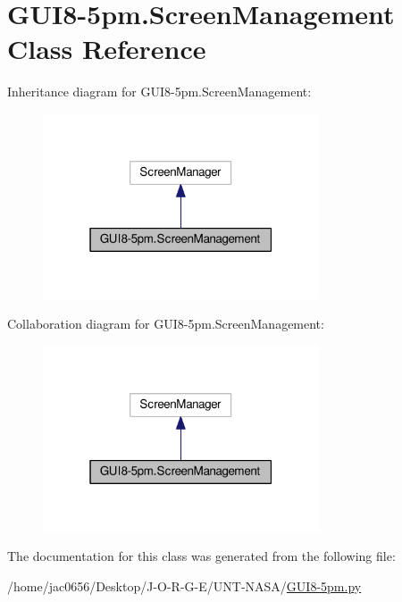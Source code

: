 \hypertarget{classGUI8-5pm_1_1ScreenManagement}{}\section{G\+U\+I8-\/5pm.Screen\+Management Class Reference}
\label{classGUI8-5pm_1_1ScreenManagement}


Inheritance diagram for G\+U\+I8-\/5pm.Screen\+Management\+:
\nopagebreak
\begin{figure}[H]
\begin{center}
\leavevmode
\includegraphics[width=232pt]{classGUI8-5pm_1_1ScreenManagement__inherit__graph}
\end{center}
\end{figure}


Collaboration diagram for G\+U\+I8-\/5pm.Screen\+Management\+:
\nopagebreak
\begin{figure}[H]
\begin{center}
\leavevmode
\includegraphics[width=232pt]{classGUI8-5pm_1_1ScreenManagement__coll__graph}
\end{center}
\end{figure}


The documentation for this class was generated from the following file\+:\begin{DoxyCompactItemize}
\item 
/home/jac0656/\+Desktop/\+J-\/\+O-\/\+R-\/\+G-\/\+E/\+U\+N\+T-\/\+N\+A\+S\+A/\hyperlink{GUI8-5pm_8py}{G\+U\+I8-\/5pm.\+py}\end{DoxyCompactItemize}

